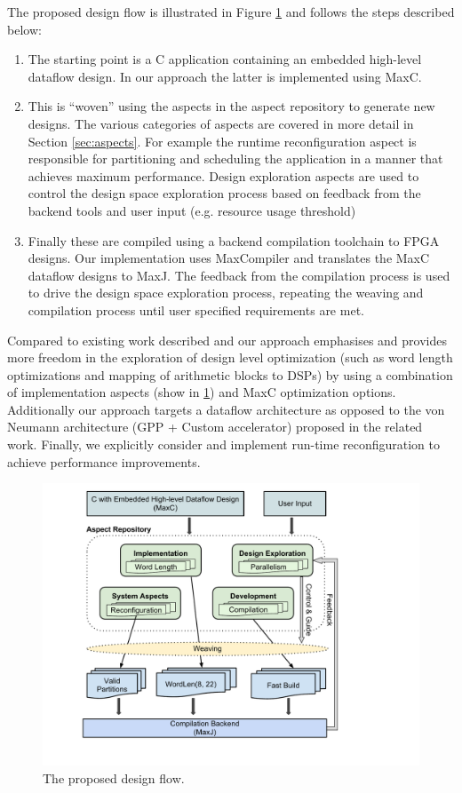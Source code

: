 The proposed design flow is illustrated in Figure
\ref{fig:design-flow} and follows the steps described below:
\begin{enumerate}
\item The starting point is a C application containing an embedded
  high-level dataflow design. In our approach the latter is
  implemented using MaxC.
\item This is ``woven'' using the aspects in the aspect repository to
  generate new designs. The various categories of aspects are covered
  in more detail in Section \ref{sec:aspects}. For example the
  runtime reconfiguration aspect is responsible for partitioning and
  scheduling the application in a manner that achieves maximum
  performance. Design exploration aspects are used to control the
  design space exploration process based on feedback from the backend
  tools and user input (e.g. resource usage threshold)
\item Finally these are compiled using a backend compilation toolchain
  to FPGA designs. Our implementation uses MaxCompiler and translates
  the MaxC dataflow designs to MaxJ.  The feedback from the
  compilation process is used to drive the design space exploration
  process, repeating the weaving and compilation process until user
  specified requirements are met.
\end{enumerate}

Compared to existing work described
\cite{Cardoso:Teixeira:Alves:Nobre:Diniz:Cutinho:Luk:2012} and
\cite{cardoso2011new} our approach emphasises and provides more
freedom in the exploration of design level optimization (such as word
length optimizations and mapping of arithmetic blocks to DSPs) by
using a combination of implementation aspects (show in
\ref{fig:design-flow}) and MaxC optimization options.  Additionally
our approach targets a dataflow architecture as opposed to the von
Neumann architecture (GPP + Custom accelerator) proposed in the
related work. Finally, we explicitly consider and implement run-time
reconfiguration to achieve performance improvements.

\begin{figure}[!h]
  \includegraphics[scale=0.51, trim=72 50 0 0]{figs/design-flow}
  \caption{The proposed design flow.}
  \label{fig:design-flow}
\end{figure}
